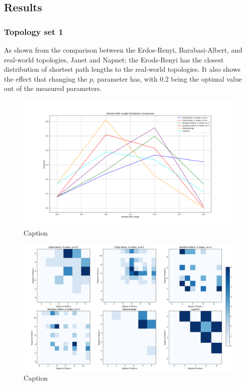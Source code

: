 

\subsection{Results}


\subsubsection{Topology set 1}
As shown from the comparison between the Erdos-Renyi, Barabasi-Albert, and real-world topologies, Janet and Napnet; the Erods-Renyi has the closest distribution of shortest path lengths to the real-world topologies. It also shows the effect that changing the $p$, parameter has, with 0.2 being the optimal value out of the measured parameters. 


\begin{figure}
    \centering
    \includegraphics[width=0.9\linewidth]{images/FINAL-TOPO-COMP/line-6.png}
    \caption{Caption}
    \label{fig:enter-label}
\end{figure}

\begin{figure}
    \centering
    \includegraphics[width=0.9\linewidth]{images/FINAL-TOPO-COMP/Degree-correlation-matrices/6-matrix.png}
    \caption{Caption}
    \label{fig:enter-label}
\end{figure}


